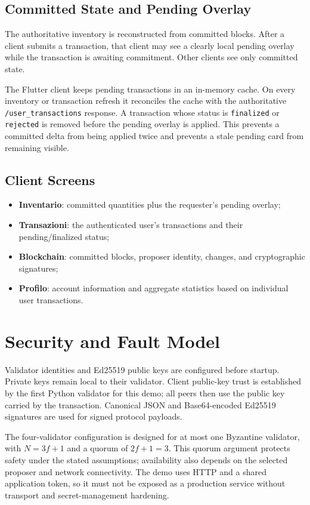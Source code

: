\documentclass[11pt,a4paper]{memoir}
\begin{document}
\section{Committed State and Pending Overlay}
The authoritative inventory is reconstructed from committed blocks. After a
client submits a transaction, that client may see a clearly local pending
overlay while the transaction is awaiting commitment. Other clients see only
committed state.

The Flutter client keeps pending transactions in an in-memory cache. On every
inventory or transaction refresh it reconciles the cache with the authoritative
\texttt{/user\_transactions} response. A transaction whose status is
\texttt{finalized} or \texttt{rejected} is removed before the pending overlay
is applied. This prevents a committed delta from being applied twice and
prevents a stale pending card from remaining visible.

\section{Client Screens}
\begin{itemize}
  \item \textbf{Inventario}: committed quantities plus the requester's pending
        overlay;
  \item \textbf{Transazioni}: the authenticated user's transactions and their
        pending/finalized status;
  \item \textbf{Blockchain}: committed blocks, proposer identity, changes, and
        cryptographic signatures;
  \item \textbf{Profilo}: account information and aggregate statistics based
        on individual user transactions.
\end{itemize}

\chapter{Security and Fault Model}

Validator identities and Ed25519 public keys are configured before startup.
Private keys remain local to their validator. Client public-key trust is
established by the first Python validator for this demo; all peers then use
the public key carried by the transaction. Canonical JSON and Base64-encoded
Ed25519 signatures are used for signed protocol payloads.

The four-validator configuration is designed for at most one Byzantine
validator, with $N=3f+1$ and a quorum of $2f+1=3$. This quorum argument
protects safety under the stated assumptions; availability also depends on
the selected proposer and network connectivity. The demo uses HTTP and a
shared application token, so it must not be exposed as a production service
without transport and secret-management hardening.
\end{document}
